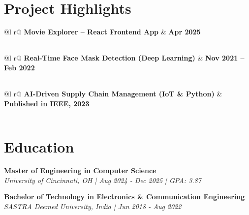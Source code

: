 \documentclass[a4paper,10pt]{article}
\begin{document}
\section{Project Highlights}

\begin{tabularx}{\linewidth}{ @{}l r@{} }
\textbf{Movie Explorer – React Frontend App} & \hfill \textbf{Apr 2025} \\[3.75pt]
  \\
\end{tabularx}

\begin{tabularx}{\linewidth}{ @{}l r@{} }
\textbf{Real-Time Face Mask Detection (Deep Learning)} & \hfill \textbf{Nov 2021 – Feb 2022} \\[3.75pt]
  \\
\end{tabularx}

\begin{tabularx}{\linewidth}{ @{}l r@{} }
\textbf{AI-Driven Supply Chain Management (IoT \& Python)} & \hfill \textbf{Published in IEEE, 2023} \\[3.75pt]
  \\
\end{tabularx}

\section{Education}

\textbf{Master of Engineering in Computer Science} \\
\textit{University of Cincinnati, OH | Aug 2024 - Dec 2025 | GPA: 3.87} 

\textbf{Bachelor of Technology in Electronics \& Communication Engineering} \\
\textit{SASTRA Deemed University, India | Jun 2018 - Aug 2022} \\
\end{document}
